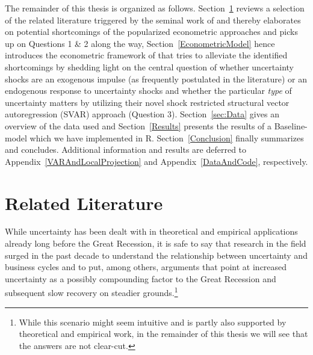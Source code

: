 \documentclass[a4paper,11pt,listof=nochaptergap,oneside,pointednumbers,bibtotoc,bigheadings,liststotoc,hidelinks]{scrbook}
\theoremstyle{mysatz}
\theoremstyle{mydefinition}
\theoremstyle{mytheorem}
\theoremstyle{mybemerkung}
\begin{document}
The remainder of this thesis is organized as follows. Section~\ref{UncertaintyandBusinessCyclesRelatedLiterature} reviews a selection of the related literature triggered by the seminal work of \citet{bloom:09} and thereby elaborates on potential shortcomings of the popularized econometric approaches and picks up on Questions 1 \& 2 along the way, Section~\ref{EconometricModel} hence introduces the econometric framework of \citet{ludvigsonetal:19} that tries to alleviate the identified shortcomings by shedding light on the central question of whether uncertainty shocks are an exogenous impulse (as frequently postulated in the literature) or an endogenous response to uncertainty shocks and whether the particular \textit{type} of uncertainty matters by utilizing their novel shock restricted structural vector autoregression (SVAR) approach (Question 3). Section~\ref{sec:Data} gives an overview of the data used and Section~\ref{Results} presents the results of a Baseline-model which we have implemented in R. Section~\ref{Conclusion} finally summarizes and concludes. Additional information and results are deferred to Appendix~\ref{VARAndLocalProjection} and Appendix~\ref{DataAndCode}, respectively.



\chapter{Related Literature}
\label{UncertaintyandBusinessCyclesRelatedLiterature}

While uncertainty has been dealt with in theoretical and empirical applications already long before the Great Recession, it is safe to say that research in the field surged in the past decade to understand the relationship between uncertainty and business cycles and to put, among others, arguments that point at increased uncertainty as a possibly compounding factor to the Great Recession and subsequent slow recovery on steadier grounds.\footnote{While this scenario might seem intuitive and is partly also supported by theoretical and empirical work, in the remainder of this thesis we will see that the answers are not clear-cut.} 
\end{document}
